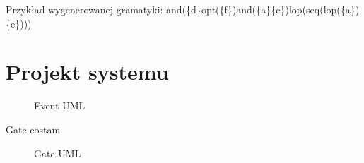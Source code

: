 Przykład wygenerowanej gramatyki:
and(\{d\}opt(\{f\})and(\{a\}\{c\})lop(seq(lop(\{a\})\{e\})))
\clearpage

\section{Projekt systemu}

\begin{figure}[h]
	\caption{\label{fig:subcaption_example}Event UML}
\end{figure}

Gate costam

\begin{figure}[h]
	\caption{\label{fig:subcaption_example}Gate UML}
\end{figure}


